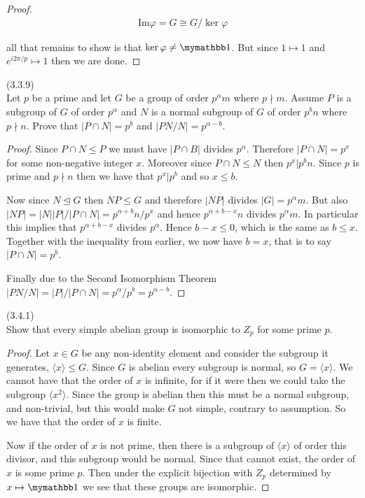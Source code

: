 \documentclass{exam}
\begin{document}
\begin{questions}
\begin{proof}
  \begin{align*}
    \text{Im}\varphi=G\cong G/\ker\varphi
  \end{align*}

  all that remains to show is that $\ker\varphi\ne \mymathbb 1$. But since $1\mapsto 1$ and $e^{i2\pi/p}\mapsto 1$ then we are done.
  \end{proof}

\question(3.3.9)\\
Let $p$ be a prime and let $G$ be a group of order $p^\alpha m$ where $p\nmid m$.  Assume $P$ is a subgroup of $G$ of order $p^\alpha$ and $N$ is a normal subgroup of $G$ of order $p^bn$ where $p\nmid n$.  Prove that $|P\cap N|=p^b$ and $|PN/N|=p^{\alpha-b}$.

\begin{proof}
  Since $P\cap N\leq P$ we must have $|P\cap B|$ divides $p^\alpha$.  Therefore $|P\cap N|=p^x$ for some non-negative integer $x$.  Moreover since $P\cap N \leq N$ then $p^{x}|p^{b}n$.  Since $p$ is prime and $p\nmid n$ then we have that $p^x | p^b$ and so $x \leq b$.

  Now since $N\trianglelefteq G$ then $NP \leq G$ and therefore $|NP|$ divides $|G|=p^\alpha m$.  But also $|NP|=|N||P|/|P\cap N|=p^{\alpha+b}n/p^x$ and hence $p^{\alpha+b-x}n$ divides $p^\alpha m$.  In particular this implies that $p^{\alpha+b-x}$ divides $p^\alpha$.  Hence $b-x\leq 0$, which is the same as $b\leq x$.  Together with the inequality from earlier, we now have $b=x$, that is to say $|P\cap N|=p^b$.

  Finally due to the Second Isomorphism Theorem $|PN/N| = |P|/|P\cap N|=p^\alpha / p^b = p^{\alpha-b}$.
\end{proof}

\question(3.4.1)\\
Show that every simple abelian group is isomorphic to $Z_p$ for some prime $p$.

\begin{proof}
  Let $x\in G$ be any non-identity element and consider the subgroup it generates, $\langle x\rangle \leq G$.  Since $G$ is abelian every subgroup is normal, so $G = \langle x\rangle$.  We cannot have that the order of $x$ is infinite, for if it were then we could take the subgroup $\langle x^2\rangle$.  Since the group is abelian then this must be a normal subgroup, and non-trivial, but this would make $G$ not simple, contrary to assumption.  So we have that the order of $x$ is finite.  

  Now if the order of $x$ is not prime, then there is a subgroup of $\langle x\rangle$ of order this divisor, and this subgroup would be normal.  Since that cannot exist, the order of $x$ is some prime $p$.  Then under the explicit bijection with $Z_p$ determined by $x\mapsto \mymathbb 1$ we see that these groups are isomorphic.
\end{proof}


\end{questions}
\end{document}
